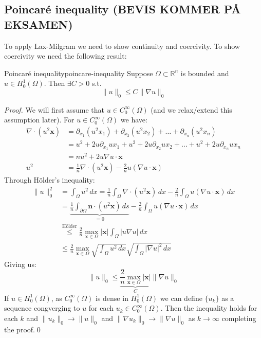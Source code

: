 \subsection{Poincaré inequality (BEVIS KOMMER PÅ EKSAMEN)}
To apply Lax-Milgram we need to show continuity and coercivity.
To show coercivity we need the following result:
\begin{lemma}{Poincaré inequality}{poincare-inequality}
    Suppose $\Omega \subset \mathbb{R}^n$ is bounded and $u \in H_0^1(\Omega)$. Then $\exists C > 0$ s.t.
    \[
        \|u\|_0 \leq C \|\nabla u\|_0
    \]
\end{lemma}
\begin{proof}
    We will first assume that $u \in C_0^\infty(\Omega)$ (and we relax/extend this assumption later).
    For $u \in C_0^\infty(\Omega)$ we have:
    \begin{align*}
        \nabla \cdot (u^2 \symbf{x}) & = \partial_{x_1}(u^2 x_1) + \partial_{x_2}(u^2 x_2) + \ldots + \partial_{x_n}(u^2 x_n)                   \\
                                     & = u^2 + 2u \partial_{x_1} u x_1 + u^2 + 2u \partial_{x_2} u x_2 + \ldots + u^2 + 2u \partial_{x_n} u x_n \\
                                     & = n u^2 + 2u \nabla u \cdot \symbf{x}                                                                    \\
        u^2                          & = \frac{1}{n} \nabla \cdot (u^2 \symbf{x}) - \frac{2}{n} u (\nabla u \cdot \symbf{x})
    \end{align*}
    Through Hölder's inequality:
    \begin{align*}
        \|u\|_0^2 & = \int_\Omega u^2 \, dx = \frac{1}{n} \int_\Omega \nabla \cdot (u^2 \symbf{x}) \, dx - \frac{2}{n} \int_\Omega u (\nabla u \cdot \symbf{x}) \, dx           \\
                  & = \underbrace{\frac{1}{n} \int_{\partial \Omega} \mathbf{n} \cdot (u^2 \symbf{x}) \, ds}_{= 0} - \frac{2}{n} \int_\Omega u (\nabla u \cdot \symbf{x}) \, dx \\
                  & \overset{\text{Hölder}}{\leq} \frac{2}{n} \max_{\symbf{x} \in \Omega} |\symbf{x}| \int_\Omega |u \nabla u| \, dx                                            \\
                  & \leq \frac{2}{n} \max_{\symbf{x} \in \Omega} \sqrt{\int_\Omega u^2 \, dx} \sqrt{\int_\Omega |\nabla u|^2 \, dx}
    \end{align*}
    Giving us:
    \[
        \|u\|_0  \leq \underbrace{\frac{2}{n} \max_{\symbf{x} \in \Omega}{|\symbf{x}|}}_{C} \|\nabla u\|_0
    \]
    If $u \in H_0^1(\Omega)$, as $C_0^\infty(\Omega)$ is dense in $H_0^1(\Omega)$ we can define $\{u_k\}$ as a sequence congverging to $u$ for each $u_k \in C_0^\infty(\Omega)$.
    Then the inequality holds for each $k$ and $\|u_k\|_0 \to \|u\|_0$ and $\|\nabla u_k\|_0 \to \|\nabla u\|_0$ as $k \to \infty$ completing the proof.\qed
\end{proof}

